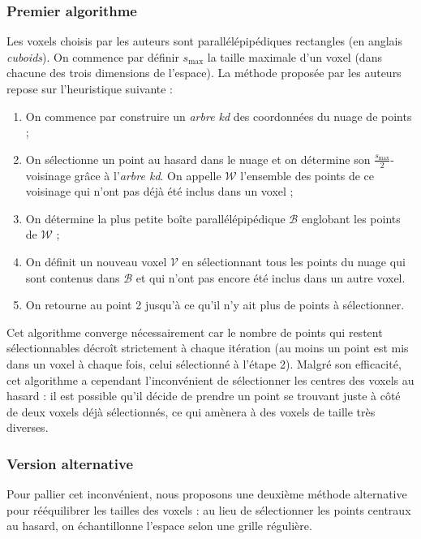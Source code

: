 \documentclass[a4paper, onecolumn, 11pt]{article}
\newcommand{\V}{\mathcal{V}}
\begin{document}
\subsubsection*{Premier algorithme}
Les voxels choisis par les auteurs sont parallélépipédiques rectangles (en anglais \emph{cuboids}). On commence par définir $s_\text{max}$ la taille maximale d'un voxel (dans chacune des trois dimensions de l'espace). La méthode proposée par les auteurs repose sur l'heuristique suivante :
\begin{enumerate}
	\item On commence par construire un \emph{arbre kd} des coordonnées du nuage de points ;
	\item On sélectionne un point au hasard dans le nuage et on détermine son $\frac{s_{\text{max}}}{2}$-voisinage grâce à l'\emph{arbre kd}. On appelle $\mathcal{W}$ l'ensemble des points de ce voisinage qui n'ont pas déjà été inclus dans un voxel ;
	\item On détermine la plus petite boîte parallélépipédique $\mathcal{B}$ englobant les points de $\mathcal{W}$ ;
	\item On définit un nouveau voxel $\V$ en sélectionnant tous les points du nuage qui sont contenus dans $\mathcal{B}$ et qui n'ont pas encore été inclus dans un autre voxel.
	\item On retourne au point 2 jusqu'à ce qu'il n'y ait plus de points à sélectionner.
\end{enumerate}

Cet algorithme converge nécessairement car le nombre de points qui restent sélectionnables décroît strictement à chaque itération (au moins un point est mis dans un voxel à chaque fois, celui sélectionné à l'étape 2). Malgré son efficacité, cet algorithme a cependant l'inconvénient de sélectionner les centres des voxels au hasard : il est possible qu'il décide de prendre un point se trouvant juste à côté de deux voxels déjà sélectionnés, ce qui amènera à des voxels de taille très diverses. 

\subsubsection*{Version alternative}
Pour pallier cet inconvénient, nous proposons une deuxième méthode alternative pour rééquilibrer les tailles des voxels : au lieu de sélectionner les points centraux au hasard, on échantillonne l'espace selon une grille régulière.
\end{document}
